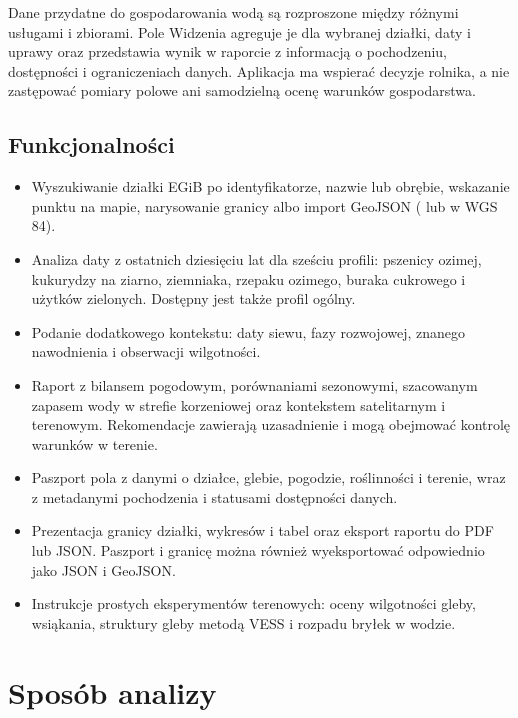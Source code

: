 \documentclass[11pt,a4paper]{article}
\newcommand{\code}[1]{\textcolor{PWField}{\texttt{\detokenize{#1}}}}
\begin{document}
Dane przydatne do gospodarowania wodą są rozproszone między różnymi usługami i zbiorami. Pole Widzenia agreguje je dla wybranej działki, daty i uprawy oraz przedstawia wynik w raporcie z informacją o pochodzeniu, dostępności i ograniczeniach danych. Aplikacja ma wspierać decyzje rolnika, a nie zastępować pomiary polowe ani samodzielną ocenę warunków gospodarstwa.

\subsection{Funkcjonalności}

\begin{itemize}
  \item Wyszukiwanie działki EGiB po identyfikatorze, nazwie lub obrębie, wskazanie punktu na mapie, narysowanie granicy albo import GeoJSON (\code{Polygon} lub \code{MultiPolygon} w WGS 84).
  \item Analiza daty z ostatnich dziesięciu lat dla sześciu profili: pszenicy ozimej, kukurydzy na ziarno, ziemniaka, rzepaku ozimego, buraka cukrowego i użytków zielonych. Dostępny jest także profil ogólny.
  \item Podanie dodatkowego kontekstu: daty siewu, fazy rozwojowej, znanego nawodnienia i obserwacji wilgotności.
  \item Raport z bilansem pogodowym, porównaniami sezonowymi, szacowanym zapasem wody w strefie korzeniowej oraz kontekstem satelitarnym i terenowym. Rekomendacje zawierają uzasadnienie i mogą obejmować kontrolę warunków w terenie.
  \item Paszport pola z danymi o działce, glebie, pogodzie, roślinności i terenie, wraz z metadanymi pochodzenia i statusami dostępności danych.
  \item Prezentacja granicy działki, wykresów i tabel oraz eksport raportu do PDF lub JSON. Paszport i granicę można również wyeksportować odpowiednio jako JSON i GeoJSON.
  \item Instrukcje prostych eksperymentów terenowych: oceny wilgotności gleby, wsiąkania, struktury gleby metodą VESS i rozpadu bryłek w wodzie.
\end{itemize}

\section{Sposób analizy}
\end{document}
